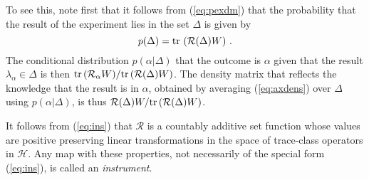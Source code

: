 \documentclass[12pt]{article}
\newcommand{\eq}[1]{(\ref{#1})}
\newcommand{\tr}{\mbox{${\rm tr}\,$}}
\renewcommand{\a}{\alpha}
\newcommand{\la}{\lambda_{\a}}
\renewcommand{\H}{\mbox{$\mathcal{H}$}}
\begin{document}
To see this, note first that it follows {}from \eq{eq:pexdm} that the
probability that the result of the experiment lies in the set $\Delta$
is given by
$$
p(\Delta)= \tr\left(\mathcal{R}(\Delta) W \right)\,. $$
The
conditional distribution $p(\a|\Delta)$ that the outcome is $\a$ given
that the result $\la\in\Delta$ is then $\tr(\mathcal{R}_\a W)/ \tr(
\mathcal{R}(\Delta) W )$. The density matrix that reflects the
knowledge that the result is in $\a$, obtained by averaging
\eq{eq:axdens} over $\Delta$ using $p(\a|\Delta)$, is thus
$\mathcal{R}(\Delta) W / \tr (\mathcal{R}(\Delta) W )$.



It follows {}from (\ref{eq:ins}) that $\mathcal{R}$ is a countably
additive set function whose values are positive preserving linear
transformations in the space of trace-class operators in \H. Any map
with these properties, not necessarily of the special form
(\ref{eq:ins}), is called an \emph{instrument}.
\end{document}
